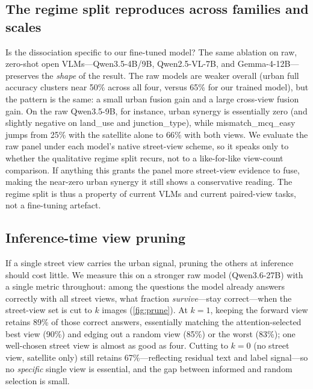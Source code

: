\subsection{The regime split reproduces across families and scales}
\label{sec:replication}

Is the dissociation specific to our fine-tuned model? The same ablation on
raw, zero-shot open VLMs---Qwen3.5-4B/9B,
Qwen2.5-VL-7B, and Gemma-4-12B---preserves the \emph{shape} of the result.
The raw models are weaker overall (urban \textsf{full} accuracy clusters near
\num{50}\% across all four, versus \num{65}\% for our trained model), but the
pattern is the same: a small urban fusion gain and a large cross-view fusion gain.
On the raw Qwen3.5-9B, for instance, urban synergy is essentially zero (and slightly
negative on \textsf{land\_use} and \textsf{junction\_type}), while
\textsf{mismatch\_mcq\_easy} jumps from \num{25}\% with the satellite alone to
\num{66}\% with both views. We evaluate the raw panel under each model's native
street-view scheme, so it speaks only to whether the qualitative regime split recurs,
not to a like-for-like view-count comparison. If anything this grants the panel more
street-view evidence to fuse, making the near-zero urban synergy it still shows a
conservative reading. The regime split is thus a property of current
VLMs and current paired-view tasks, not a fine-tuning artefact.

\subsection{Inference-time view pruning}
\label{sec:pruning}

If a single street view carries the urban signal, pruning the others at inference
should cost little. We measure this on a stronger raw model (Qwen3.6-27B) with a
single metric throughout: among the questions the model already answers correctly
with all street views, what fraction \emph{survive}---stay correct---when the
street-view set is cut to $k$ images (\cref{fig:prune}). At $k{=}\num{1}$, keeping
the forward view retains \num{89}\% of those correct answers, essentially matching
the attention-selected best view (\num{90}\%) and edging out a random view
(\num{85}\%) or the worst (\num{83}\%); one well-chosen street view is almost as good
as four. Cutting to $k{=}\num{0}$ (no street view, satellite only) still retains
\num{67}\%---reflecting residual text and label signal---so no \emph{specific} single
view is essential, and the gap between informed and random selection is small.

